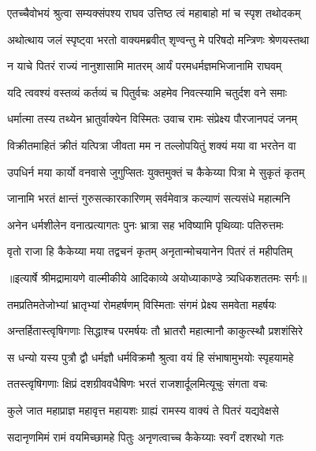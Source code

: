 \twolineshloka
{एतच्चैवोभयं श्रुत्वा सम्यक्संपश्य राघव}
{उत्तिष्ठ त्वं महाबाहो मां च स्पृश तथोदकम्} %

\twolineshloka
{अथोत्थाय जलं स्पृष्ट्वा भरतो वाक्यमब्रवीत्}
{शृण्वन्तु मे परिषदो मन्त्रिणः श्रेणयस्तथा} %

\twolineshloka
{न याचे पितरं राज्यं नानुशासामि मातरम्}
{आर्यं परमधर्मज्ञमभिजानामि राघवम्} %

\twolineshloka
{यदि त्ववश्यं वस्तव्यं कर्तव्यं च पितुर्वचः}
{अहमेव निवत्स्यामि चतुर्दश वने समाः} %

\twolineshloka
{धर्मात्मा तस्य तथ्येन भ्रातुर्वाक्येन विस्मितः}
{उवाच रामः संप्रेक्ष्य पौरजानपदं जनम्} %

\twolineshloka
{विक्रीतमाहितं क्रीतं यत्पित्रा जीवता मम}
{न तल्लोपयितुं शक्यं मया वा भरतेन वा} %

\twolineshloka
{उपधिर्न मया कार्यो वनवासे जुगुप्सितः}
{युक्तमुक्तं च कैकेय्या पित्रा मे सुकृतं कृतम्} %

\twolineshloka
{जानामि भरतं क्षान्तं गुरुसत्कारकारिणम्}
{सर्वमेवात्र कल्याणं सत्यसंधे महात्मनि} %

\twolineshloka
{अनेन धर्मशीलेन वनात्प्रत्यागतः पुनः}
{भ्रात्रा सह भविष्यामि पृथिव्याः पतिरुत्तमः} %

\twolineshloka
{वृतो राजा हि कैकेय्या मया तद्वचनं कृतम्}
{अनृतान्मोचयानेन पितरं तं महीपतिम्} %


{॥इत्यार्षे श्रीमद्रामायणे वाल्मीकीये आदिकाव्ये अयोध्याकाण्डे त्र्यधिकशततमः सर्गः॥}


\twolineshloka
{तमप्रतिमतेजोभ्यां भ्रातृभ्यां रोमहर्षणम्}
{विस्मिताः संगमं प्रेक्ष्य समवेता महर्षयः} %

\twolineshloka
{अन्तर्हितास्त्वृषिगणाः सिद्धाश्च परमर्षयः}
{तौ भ्रातरौ महात्मानौ काकुत्स्थौ प्रशशंसिरे} %

\twolineshloka
{स धन्यो यस्य पुत्रौ द्वौ धर्मज्ञौ धर्मविक्रमौ}
{श्रुत्वा वयं हि संभाषामुभयोः स्पृहयामहे} %

\twolineshloka
{ततस्त्वृषिगणाः क्षिप्रं दशग्रीववधैषिणः}
{भरतं राजशार्दूलमित्यूचुः संगता वचः} %

\twolineshloka
{कुले जात महाप्राज्ञ महावृत्त महायशः}
{ग्राह्यं रामस्य वाक्यं ते पितरं यद्यवेक्षसे} %

\twolineshloka
{सदानृणमिमं रामं वयमिच्छामहे पितुः}
{अनृणत्वाच्च कैकेय्याः स्वर्गं दशरथो गतः} %


